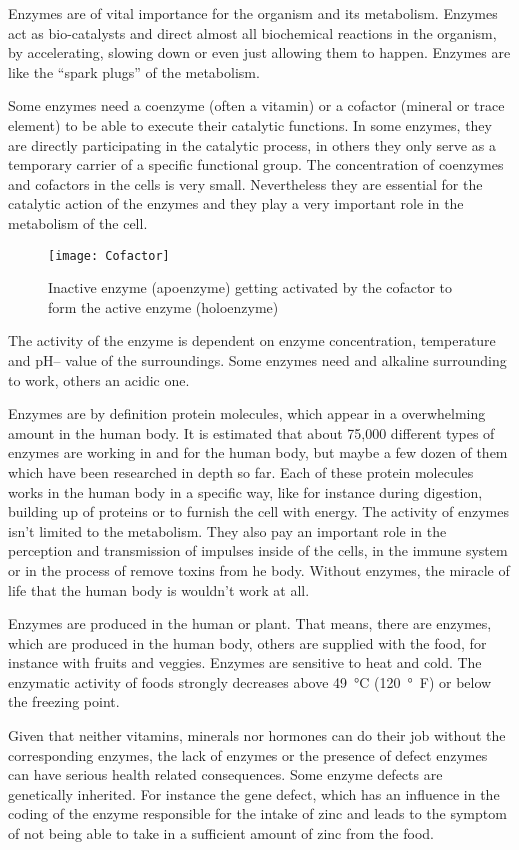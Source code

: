 \documentclass[../main.tex]{subfiles}
\begin{document}
Enzymes are of vital importance for the organism and its metabolism.
Enzymes act as bio-catalysts and direct almost all biochemical reactions in the organism, by accelerating, slowing down or even just allowing them to happen.
Enzymes are like the ``spark plugs'' of the metabolism.

Some enzymes need a coenzyme (often a vitamin) or a cofactor
(mineral or trace element) to be able to execute their catalytic functions.
In some enzymes, they are directly participating in the catalytic process,
in others they only serve as a temporary carrier of a specific functional group.
The concentration of coenzymes and cofactors in the cells is very small.
Nevertheless they are essential for the catalytic action of the enzymes and they play a very important role in the metabolism of the cell.

\begin{figure}[htb!]
\centering
  \texttt{[image: Cofactor]}
  \caption[Enzyme getting activated by cofactor]{Inactive enzyme (apoenzyme) getting activated by the cofactor to form the active enzyme (holoenzyme)\cite{Cofactor}}
\end{figure}

The activity of the enzyme is dependent on enzyme concentration, temperature and pH-- value of the surroundings.
Some enzymes need and alkaline surrounding to work, others an acidic one.

Enzymes are by definition protein molecules, which appear in a overwhelming amount in the human body.
It is estimated that about 75,000 different types of enzymes are working in and for the human body,
but maybe a few dozen of them which have been researched in depth so far.
Each of these protein molecules works in the human body in a specific way, like for instance during digestion,
building up of proteins or to furnish the cell with energy.
The activity of enzymes isn't limited to the metabolism.
They also pay an important role in the perception and transmission of impulses inside of the cells, in the immune system or
in the process of remove toxins from he body.
Without enzymes, the miracle of life that the human body is wouldn't work at all.

Enzymes are produced in the human or plant.
That means, there are enzymes, which are produced in the human body, others are supplied with the food, for instance with fruits and veggies.
Enzymes are sensitive to heat and cold.
The enzymatic activity of foods strongly decreases above \SI{49}{\degreeCelsius} (\SI{120}{\degree \F}) or below the freezing point.

Given that neither vitamins, minerals nor hormones can do their job without the corresponding enzymes, the lack of enzymes or the
presence of defect enzymes can have serious health related consequences.
Some enzyme defects are genetically inherited.
For instance the gene defect, which has an influence in the coding of the enzyme responsible for the intake of zinc and
leads to the symptom of not being able to take in a sufficient amount of zinc from the food.
\end{document}
